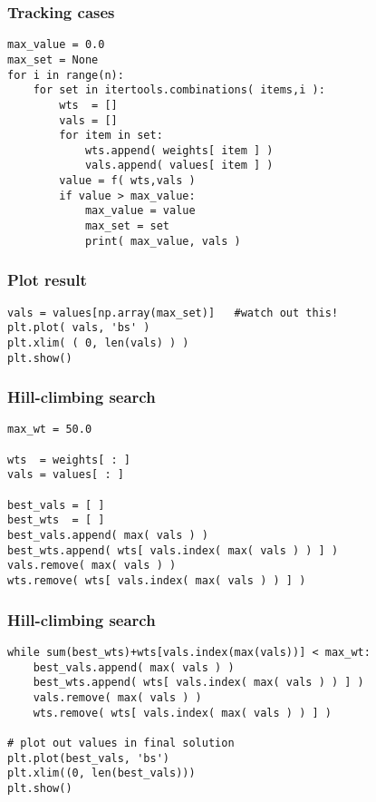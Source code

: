 \documentclass[11pt]{beamer}
\begin{document}
\begin{frame}[fragile]
  \frametitle{Tracking cases}

  \begin{Verbatim}
max_value = 0.0
max_set = None
for i in range(n):
    for set in itertools.combinations( items,i ):
        wts  = []
        vals = []
        for item in set:
            wts.append( weights[ item ] )
            vals.append( values[ item ] )
        value = f( wts,vals )
        if value > max_value:
            max_value = value
            max_set = set
            print( max_value, vals )
  \end{Verbatim}
\end{frame}


\begin{frame}[fragile]
  \frametitle{Plot result}

  \begin{Verbatim}
vals = values[np.array(max_set)]   #watch out this!
plt.plot( vals, 'bs' )
plt.xlim( ( 0, len(vals) ) )
plt.show()
  \end{Verbatim}
\end{frame}


\begin{frame}[fragile]
  \frametitle{Hill-climbing search}

  \begin{Verbatim}
max_wt = 50.0

wts  = weights[ : ]
vals = values[ : ]

best_vals = [ ]
best_wts  = [ ]
best_vals.append( max( vals ) )
best_wts.append( wts[ vals.index( max( vals ) ) ] )
vals.remove( max( vals ) )
wts.remove( wts[ vals.index( max( vals ) ) ] )
  \end{Verbatim}
\end{frame}

\begin{frame}[fragile]
  \frametitle{Hill-climbing search}

  \begin{Verbatim}
while sum(best_wts)+wts[vals.index(max(vals))] < max_wt:
    best_vals.append( max( vals ) )
    best_wts.append( wts[ vals.index( max( vals ) ) ] )
    vals.remove( max( vals ) )
    wts.remove( wts[ vals.index( max( vals ) ) ] )

# plot out values in final solution
plt.plot(best_vals, 'bs')
plt.xlim((0, len(best_vals)))
plt.show()
  \end{Verbatim}
\end{frame}
\end{document}
